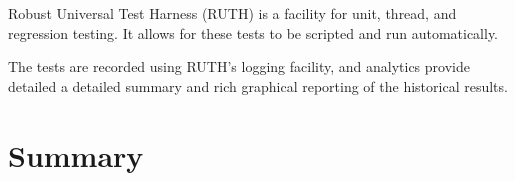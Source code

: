 \documentclass{article}[11pt]
\begin{document}
\par Robust Universal Test Harness (RUTH) is a facility for unit, thread, and regression testing.  It allows for these tests to be scripted and run automatically.  

\par The tests are recorded using RUTH's logging facility, and analytics provide detailed a detailed summary and rich graphical reporting of the historical results.

\section{Summary}

%
\end{document}
